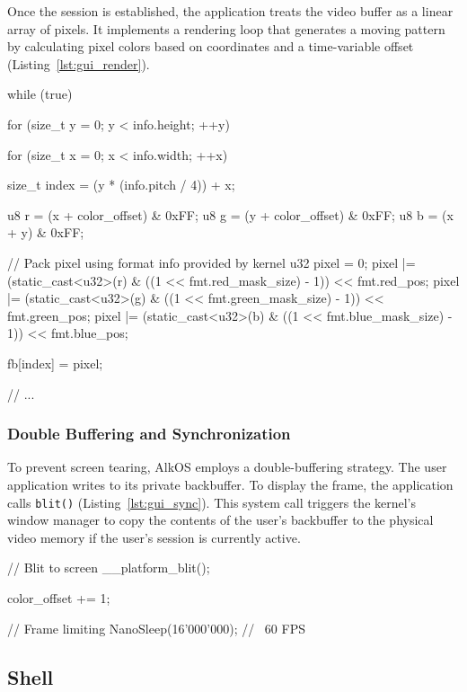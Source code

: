 \documentclass[a4paper,10pt,twoside]{report}
\theoremstyle{definition}
\begin{document}
Once the session is established, the application treats the video buffer as a linear array of pixels. It implements a rendering loop that generates a moving pattern by calculating pixel colors based on coordinates and a time-variable offset (Listing~\ref{lst:gui_render}).

\clearpage

\begin{cppcode}[caption={Software Rendering Loop}, label={lst:gui_render}]
    while (true) {
        for (size_t y = 0; y < info.height; ++y) {
            for (size_t x = 0; x < info.width; ++x) {
                size_t index = (y * (info.pitch / 4)) + x;

                u8 r = (x + color_offset) & 0xFF;
                u8 g = (y + color_offset) & 0xFF;
                u8 b = (x + y) & 0xFF;

                // Pack pixel using format info provided by kernel
                u32 pixel = 0;
                pixel |= (static_cast<u32>(r) & ((1 << fmt.red_mask_size) - 1)) << fmt.red_pos;
                pixel |= (static_cast<u32>(g) & ((1 << fmt.green_mask_size) - 1)) << fmt.green_pos;
                pixel |= (static_cast<u32>(b) & ((1 << fmt.blue_mask_size) - 1)) << fmt.blue_pos;

                fb[index] = pixel;
            }
        }
        // ...
    }
\end{cppcode}

\subsubsection{Double Buffering and Synchronization}

To prevent screen tearing, AlkOS employs a double-buffering strategy. The user application writes to its private backbuffer. To display the frame, the application calls \texttt{blit()} (Listing~\ref{lst:gui_sync}). This system call triggers the kernel's window manager to copy the contents of the user's backbuffer to the physical video memory if the user's session is currently active.

\begin{cppcode}[caption={Frame Synchronization}, label={lst:gui_sync}]
    // Blit to screen
    __platform_blit();

    color_offset += 1;

    // Frame limiting
    NanoSleep(16'000'000); // ~60 FPS
\end{cppcode}

\subsection{Shell}
\end{document}
